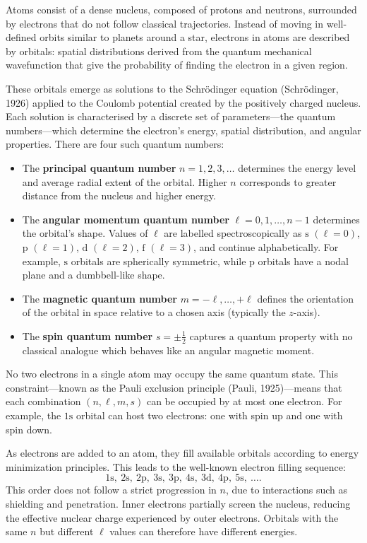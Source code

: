 Atoms consist of a dense nucleus, composed of protons and neutrons, surrounded by electrons that do not follow classical trajectories. Instead of moving in well-defined orbits similar to planets around a star, electrons in atoms are described by orbitals: spatial distributions derived from the quantum mechanical wavefunction that give the probability of finding the electron in a given region.

These orbitals emerge as solutions to the Schrödinger equation (Schrödinger, 1926) applied to the Coulomb potential created by the positively charged nucleus. Each solution is characterised by a discrete set of parameters—the quantum numbers—which determine the electron's energy, spatial distribution, and angular properties. There are four such quantum numbers:

\begin{itemize}[leftmargin=*]
  \item The \textbf{principal quantum number} $n = 1, 2, 3, \ldots$ determines the energy level and average radial extent of the orbital. Higher $n$ corresponds to greater distance from the nucleus and higher energy.
  \item The \textbf{angular momentum quantum number} $\ell = 0, 1, \ldots, n-1$ determines the orbital's shape. Values of $\ell$ are labelled spectroscopically as $\mathrm{s}$ $(\ell=0)$, $\mathrm{p}$ $(\ell=1)$, $\mathrm{d}$ $(\ell=2)$, $\mathrm{f}$ $(\ell=3)$, and continue alphabetically. For example, $\mathrm{s}$ orbitals are spherically symmetric, while $\mathrm{p}$ orbitals have a nodal plane and a dumbbell-like shape.
  \item The \textbf{magnetic quantum number} $m = -\ell, \ldots, +\ell$ defines the orientation of the orbital in space relative to a chosen axis (typically the $z$-axis).
  \item The \textbf{spin quantum number} $s = \pm \tfrac{1}{2}$ captures a quantum property with no classical analogue which behaves like an angular magnetic moment.
\end{itemize}

No two electrons in a single atom may occupy the same quantum state. This constraint—known as the Pauli exclusion principle (Pauli, 1925)—means that each combination $(n, \ell, m, s)$ can be occupied by at most one electron. For example, the $1\mathrm{s}$ orbital can host two electrons: one with spin up and one with spin down.

As electrons are added to an atom, they fill available orbitals according to energy minimization principles. This leads to the well-known electron filling sequence:
\[
1\mathrm{s},\ 2\mathrm{s},\ 2\mathrm{p},\ 3\mathrm{s},\ 3\mathrm{p},\ 4\mathrm{s},\ 3\mathrm{d},\ 4\mathrm{p},\ 5\mathrm{s},\ \ldots.
\]
This order does not follow a strict progression in $n$, due to interactions such as shielding and penetration. Inner electrons partially screen the nucleus, reducing the effective nuclear charge experienced by outer electrons. Orbitals with the same $n$ but different $\ell$ values can therefore have different energies.

